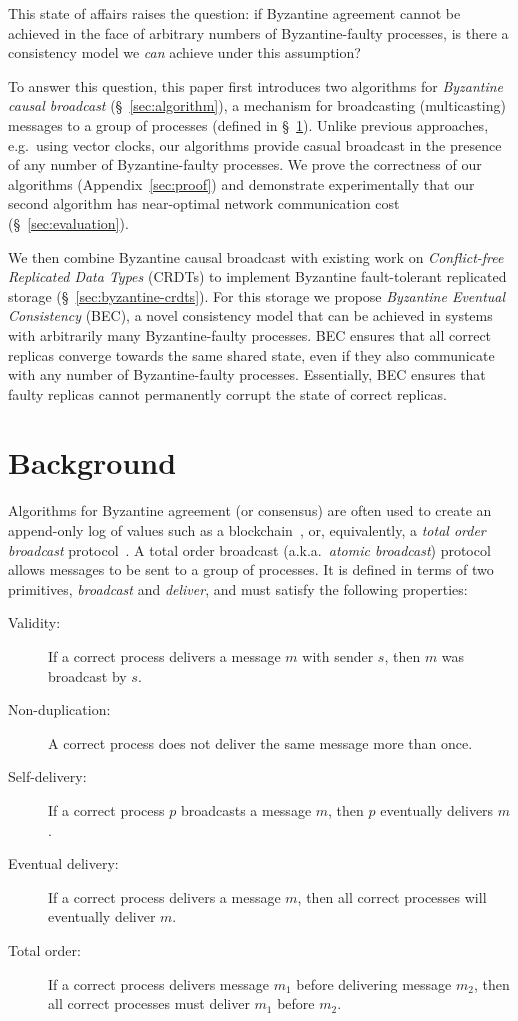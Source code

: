 \documentclass[a4paper,anonymous,USenglish]{lipics-v2019}
\begin{document}
This state of affairs raises the question: if Byzantine agreement cannot be achieved in the face of arbitrary numbers of Byzantine-faulty processes, is there a consistency model we \emph{can} achieve under this assumption?

To answer this question, this paper first introduces two algorithms for \emph{Byzantine causal broadcast} (\S~\ref{sec:algorithm}), a mechanism for broadcasting (multicasting) messages to a group of processes (defined in \S~\ref{sec:background}).
Unlike previous approaches, e.g.\ using vector clocks, our algorithms provide casual broadcast in the presence of any number of Byzantine-faulty processes.
We prove the correctness of our algorithms (Appendix~\ref{sec:proof}) and demonstrate experimentally that our second algorithm has near-optimal network communication cost (\S~\ref{sec:evaluation}).

We then combine Byzantine causal broadcast with existing work on \emph{Conflict-free Replicated Data Types} (CRDTs) to implement Byzantine fault-tolerant replicated storage  (\S~\ref{sec:byzantine-crdts}).
For this storage we propose \emph{Byzantine Eventual Consistency} (BEC), a novel consistency model that can be achieved in systems with arbitrarily many Byzantine-faulty processes.
BEC ensures that all correct replicas converge towards the same shared state, even if they also communicate with any number of Byzantine-faulty processes.
Essentially, BEC ensures that faulty replicas cannot permanently corrupt the state of correct replicas.

\section{Background}\label{sec:background}

Algorithms for Byzantine agreement (or consensus) are often used to create an append-only log of values such as a blockchain~\cite{Bano:2019}, or, equivalently, a \emph{total order broadcast} protocol~\cite{Cachin:2011wt,Defago:2004ji}.
A total order broadcast (a.k.a.\ \emph{atomic broadcast}) protocol allows messages to be sent to a group of processes.
It is defined in terms of two primitives, \emph{broadcast} and \emph{deliver}, and must satisfy the following properties:

\begin{description}
\item[Validity:] If a correct process delivers a message $m$ with sender $s$, then $m$ was broadcast by $s$.
\item[Non-duplication:] A correct process does not deliver the same message more than once.
\item[Self-delivery:] If a correct process $p$ broadcasts a message $m$, then $p$ eventually delivers $m$.
\item[Eventual delivery:] If a correct process delivers a message $m$, then all correct processes will eventually deliver $m$.
\item[Total order:] If a correct process delivers message $m_1$ before delivering message $m_2$, then all correct processes must deliver $m_1$ before $m_2$.
\end{description}
\end{document}
